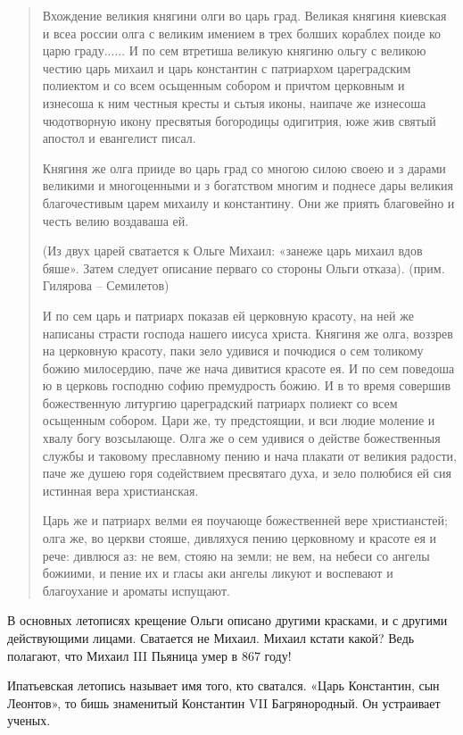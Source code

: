 \begin{quotation}
Вхождение великия княгини олги во царь град. Великая княгиня киевская и всеа россии олга с великим имением в трех болших кораблех поиде ко царю граду...... И по сем втретиша великую княгиню ольгу с великою честию царь михаил и царь константин с патриархом цареградским полиектом и со всем осьщенным собором и причтом церковным и изнесоша к ним честныя кресты и сьтыя иконы, наипаче же изнесоша чюдотворную икону пресвятыя богородицы одигитрия, юже жив святый апостол и евангелист писал.

Княгиня же олга прииде во царь град со многою силою своею и з дарами великими и многоценными и з богатством многим и поднесе дары великия благочестивым царем михаилу и константину. Они же приять благовейно и честь велию воздаваша ей.

(Из двух царей сватается к Ольге Михаил: «занеже царь михаил вдов бяше». Затем следует описание перваго со стороны Ольги отказа). (прим. Гилярова – Семилетов)
  
И по сем царь и патриарх показав ей церковную красоту, на ней же написаны страсти господа нашего иисуса христа. Княгиня же олга, воззрев на церковную красоту, паки зело удивися и почюдися о сем толикому божию милосердию, паче же нача дивитися красоте ея. И по сем поведоша ю в церковь господню софию премудрость божию. И в то время совершив божественную литургию цареградский патриарх полиект со всем осьщенным собором. Цари же, ту предстоящии, и вси людие моление и хвалу богу возсылающе. Олга же о сем удивися о действе божественныя службы и таковому преславному пению и нача плакати от великия радости, паче же душею горя содействием пресвятаго духа, и зело полюбися ей сия истинная вера христианская.

Царь же и патриарх велми ея поучающе божественней вере христианстей; олга же, во церкви стояше, дивляхуся пению церковному и красоте ея и рече: дивлюся аз: не вем, стояю на земли; не вем, на небеси со ангелы божиими, и пение их и гласы аки ангелы ликуют и воспевают и благоухание и ароматы испущают. 
\end{quotation}

В основных летописях крещение Ольги описано другими красками, и с другими действующими лицами. Сватается не Михаил. Михаил кстати какой? Ведь полагают, что Михаил III Пьяница умер в 867 году!

Ипатьевская летопись называет имя того, кто сватался. «Царь Константин, сын Леонтов», то бишь знаменитый Константин VII Багрянородный. Он устраивает ученых.

